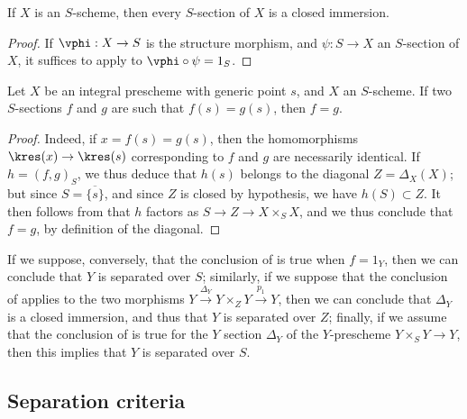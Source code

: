 \begin{corollary}[5.4.6]
\label{I.5.4.6}
If $X$ is an $S$-scheme, then every $S$-section of $X$  is a closed immersion.
\end{corollary}

\begin{proof}
If $\vphi:X\to S$ is the structure morphism, and $\psi:S\to X$ an $S$-section of $X$, it suffices to apply  to $\vphi\circ\psi=1_S$.
\end{proof}

\begin{corollary}[5.4.7]
\label{I.5.4.7}
Let $X$ be an integral prescheme with generic point $s$, and $X$ an $S$-scheme.
If two $S$-sections $f$ and $g$ are such that $f(s)=g(s)$, then $f=g$.
\end{corollary}

\begin{proof}
Indeed, if $x=f(s)=g(s)$, then the homomorphisms $\kres(x)\to\kres(s)$ corresponding to $f$ and $g$ are necessarily identical.
If $h=(f,g)_S$, we thus deduce  that $h(s)$ belongs to the diagonal $Z=\Delta_X(X)$;
but since $S=\overline{\{s\}}$, and since $Z$ is closed by hypothesis, we have $h(S)\subset Z$.
It then follows from  that $h$ factors as $S\to Z\to X\times_S X$, and we thus conclude that $f=g$, by definition of the diagonal.
\end{proof}

\begin{remark}[5.4.8]
\label{I.5.4.8}
If we suppose, conversely, that the conclusion of  is true when $f=1_Y$, then we can conclude that $Y$ is separated over $S$;
similarly, if we suppose that the conclusion of  applies to the two morphisms $Y\xrightarrow{\Delta_Y}Y\times_Z Y\xrightarrow{p_1}Y$, then we can conclude that $\Delta_Y$ is a closed immersion, and thus that $Y$ is separated over $Z$;
finally, if we assume that the conclusion of  is true for the $Y$ section $\Delta_Y$ of the $Y$-prescheme $Y\times_S Y\to Y$, then this implies that $Y$ is separated over $S$.
\end{remark}

\subsection{Separation criteria}
\label{subsection:I.5.5}

